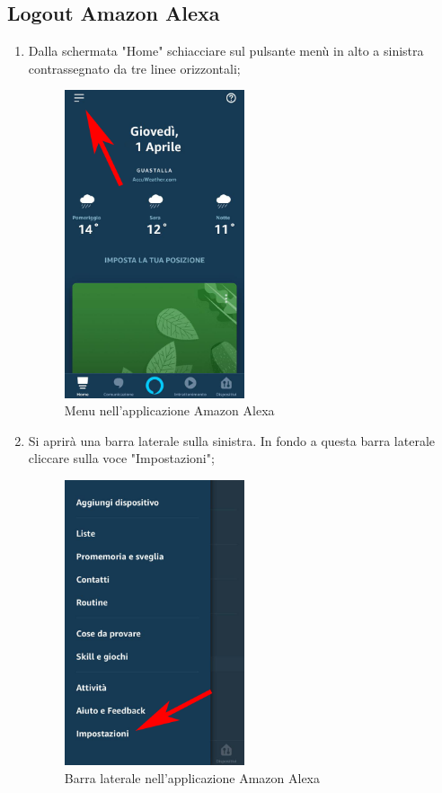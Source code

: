\subsection{Logout Amazon Alexa}
\begin{enumerate}
\item Dalla schermata "Home" schiacciare sul pulsante menù in alto a sinistra contrassegnato da tre linee orizzontali;

\begin{figure}[H]
	\centering
	\includegraphics[width=0.5\textwidth]{images/MenuAlexa.png}
	\caption{Menu nell'applicazione Amazon Alexa}
\end{figure}

\newpage
\item Si aprirà una barra laterale sulla sinistra. In fondo a questa barra laterale cliccare sulla voce "Impostazioni";

\begin{figure}[H]
	\centering
	\includegraphics[width=0.5\textwidth]{images/ImpostazioniAlexa.png}
	\caption{Barra laterale nell'applicazione Amazon Alexa}
\end{figure}


\end{enumerate}
